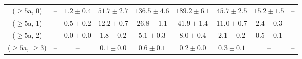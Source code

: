\begin{table}[h!]
{\begin{tabular}{ccccccccc}
	($\ge5$a, 0) & -- & $1.2\pm 0.4$ & $51.7\pm 2.7$ & $136.5\pm 4.6$ & $189.2\pm 6.1$ & $45.7\pm 2.5$ & $15.2\pm 1.5$ & -- \\[0.5ex] 
	($\ge5$a, 1) & -- & $0.5\pm 0.2$ & $12.2\pm 0.7$ & $26.8\pm 1.1$ & $41.9\pm 1.4$ & $11.0\pm 0.7$ & $2.4\pm 0.3$ & -- \\[0.5ex] 
	($\ge5$a, 2) & -- & $0.0\pm 0.0$ & $1.8\pm 0.2$ & $5.1\pm 0.3$ & $8.0\pm 0.4$ & $2.1\pm 0.2$ & $0.5\pm 0.1$ & -- \\[0.5ex] 
	($\ge5$a, $\ge3$) & -- & -- & $0.1\pm 0.0$ & $0.6\pm 0.1$ & $0.2\pm 0.0$ & $0.3\pm 0.1$ & -- & -- \\[0.5ex] 
	\hline
	\hline
\end{tabular}}
\end{table}
